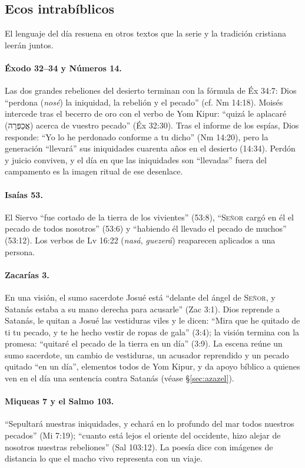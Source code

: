 \documentclass[11pt,letterpaper]{article}
\newcommand{\heb}[1]{\mbox{\foreignlanguage{hebrew}{#1}}}
\newcommand{\SENOR}{\textsc{Señor}}
\begin{document}
\subsection{Ecos intrabíblicos}
El lenguaje del día resuena en otros textos que la serie y la tradición cristiana leerán juntos.

\paragraph{Éxodo 32--34 y Números 14.} Las dos grandes rebeliones del desierto terminan con la fórmula de Éx 34:7: Dios ``perdona (\emph{nosé}) la iniquidad, la rebelión y el pecado'' (cf. Nm 14:18). Moisés intercede tras el becerro de oro con el verbo de Yom Kipur: ``quizá le aplacaré (\heb{אֲכַפְּרָה}) acerca de vuestro pecado'' (Éx 32:30). Tras el informe de los espías, Dios responde: ``Yo lo he perdonado conforme a tu dicho'' (Nm 14:20), pero la generación ``llevará'' sus iniquidades cuarenta años en el desierto (14:34). Perdón y juicio conviven, y el día en que las iniquidades son ``llevadas'' fuera del campamento es la imagen ritual de ese desenlace.

\paragraph{Isaías 53.} El Siervo ``fue cortado de la tierra de los vivientes'' (53:8), ``\SENOR{} cargó en él el pecado de todos nosotros'' (53:6) y ``habiendo él llevado el pecado de muchos'' (53:12). Los verbos de Lv 16:22 (\emph{nasá}, \emph{guezerá}) reaparecen aplicados a una persona.

\paragraph{Zacarías 3.} En una visión, el sumo sacerdote Josué está ``delante del ángel de \SENOR, y Satanás estaba a su mano derecha para acusarle'' (Zac 3:1). Dios reprende a Satanás, le quitan a Josué las vestiduras viles y le dicen: ``Mira que he quitado de ti tu pecado, y te he hecho vestir de ropas de gala'' (3:4); la visión termina con la promesa: ``quitaré el pecado de la tierra en un día'' (3:9). La escena reúne un sumo sacerdote, un cambio de vestiduras, un acusador reprendido y un pecado quitado ``en un día'', elementos todos de Yom Kipur, y da apoyo bíblico a quienes ven en el día una sentencia contra Satanás (véase §\ref{sec:azazel}).

\paragraph{Miqueas 7 y el Salmo 103.} ``Sepultará nuestras iniquidades, y echará en lo profundo del mar todos nuestros pecados'' (Mi 7:19); ``cuanto está lejos el oriente del occidente, hizo alejar de nosotros nuestras rebeliones'' (Sal 103:12). La poesía dice con imágenes de distancia lo que el macho vivo representa con un viaje.
\end{document}
